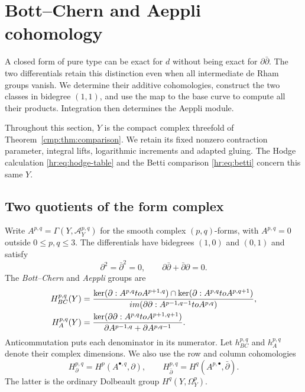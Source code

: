 \section{Bott--Chern and Aeppli cohomology}
\label{sec:bott-chern}

A closed form of pure type can be exact for $d$ without being
exact for $\partial\bar\partial$.
The two differentials retain this distinction even when all
intermediate de Rham groups vanish. We determine their additive
cohomologies, construct the two classes in bidegree $(1,1)$,
and use the map to the base curve to compute all their products.
Integration then determines the Aeppli module.

Throughout this section, $Y$ is the compact complex threefold of
Theorem~\ref{cmp:thm:comparison}. We retain its fixed nonzero
contraction parameter, integral lifts, logarithmic increments
and adapted gluing. The Hodge calculation
\eqref{hr:eq:hodge-table} and the Betti comparison
\eqref{hr:eq:betti} concern this same $Y$.

\subsection{Two quotients of the form complex}

Write $A^{p,q}=\Gamma(Y,\mathcal A_Y^{p,q})$ for the smooth
complex $(p,q)$-forms, with $A^{p,q}=0$ outside
$0\le p,q\le3$. The differentials have bidegrees $(1,0)$ and
$(0,1)$ and satisfy
\[
 \partial^2=\bar\partial^2=0,\qquad
 \partial\bar\partial+\bar\partial\partial=0.
\]
The \emph{Bott--Chern} and \emph{Aeppli} groups are
\begin{align}
 H_{BC}^{p,q}(Y)
 &=\frac{\ker(\partial:A^{p,q}to A^{p+1,q})
                 \cap\ker(\partial:A^{p,q}to A^{p,q+1})}
          {im(\partial\partial:A^{p-1,q-1}to A^{p,q})},
       \label{bc:eq:definition-BC}\\
 H_A^{p,q}(Y)
 &=\frac{\ker(\partial\partial:A^{p,q}to A^{p+1,q+1})}
          {\partial A^{p-1,q}+\partial A^{p,q-1}}.
       \label{bc:eq:definition-A}
\end{align}
Anticommutation puts each denominator in its numerator.
Let $h_{BC}^{p,q}$ and $h_A^{p,q}$ denote their complex dimensions.
We also use the row and column cohomologies
\[
 H_\partial^{p,q}=H^p(A^{\bullet,q},\partial),\qquad
 H_{\bar\partial}^{p,q}=H^q(A^{p,\bullet},\bar\partial).
\]
The latter is the ordinary Dolbeault group
$H^q(Y,\Omega_Y^p)$.

